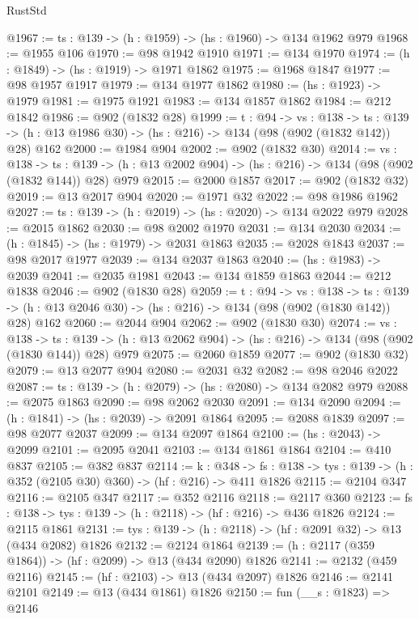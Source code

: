 \begin{lexlean}{RustStd}
\begin{coremodule}
@1967 := {ts : @139} -> (h : @1959) -> (hs : @1960) -> @134 @1962 @979
@1968 := @1955 @106
@1970 := @98 @1942 @1910
@1971 := @134 @1970
@1974 := (h : @1849) -> (hs : @1919) -> @1971 @1862
@1975 := @1968 @1847
@1977 := @98 @1957 @1917
@1979 := @134 @1977 @1862
@1980 := (hs : @1923) -> @1979
@1981 := @1975 @1921
@1983 := @134 @1857 @1862
@1984 := @212 @1842
@1986 := @902 (@1832 @28)
@1999 := {t : @94} ->
  {vs : @138} ->
  {ts : @139} -> (h : @13 @1986 @30) -> (hs : @216) -> @134 (@98 (@902 (@1832 @142)) @28) @162
@2000 := @1984 @904
@2002 := @902 (@1832 @30)
@2014 := {vs : @138} ->
  {ts : @139} -> (h : @13 @2002 @904) -> (hs : @216) -> @134 (@98 (@902 (@1832 @144)) @28) @979
@2015 := @2000 @1857
@2017 := @902 (@1832 @32)
@2019 := @13 @2017 @904
@2020 := @1971 @32
@2022 := @98 @1986 @1962
@2027 := {ts : @139} -> (h : @2019) -> (hs : @2020) -> @134 @2022 @979
@2028 := @2015 @1862
@2030 := @98 @2002 @1970
@2031 := @134 @2030
@2034 := (h : @1845) -> (hs : @1979) -> @2031 @1863
@2035 := @2028 @1843
@2037 := @98 @2017 @1977
@2039 := @134 @2037 @1863
@2040 := (hs : @1983) -> @2039
@2041 := @2035 @1981
@2043 := @134 @1859 @1863
@2044 := @212 @1838
@2046 := @902 (@1830 @28)
@2059 := {t : @94} ->
  {vs : @138} ->
  {ts : @139} -> (h : @13 @2046 @30) -> (hs : @216) -> @134 (@98 (@902 (@1830 @142)) @28) @162
@2060 := @2044 @904
@2062 := @902 (@1830 @30)
@2074 := {vs : @138} ->
  {ts : @139} -> (h : @13 @2062 @904) -> (hs : @216) -> @134 (@98 (@902 (@1830 @144)) @28) @979
@2075 := @2060 @1859
@2077 := @902 (@1830 @32)
@2079 := @13 @2077 @904
@2080 := @2031 @32
@2082 := @98 @2046 @2022
@2087 := {ts : @139} -> (h : @2079) -> (hs : @2080) -> @134 @2082 @979
@2088 := @2075 @1863
@2090 := @98 @2062 @2030
@2091 := @134 @2090
@2094 := (h : @1841) -> (hs : @2039) -> @2091 @1864
@2095 := @2088 @1839
@2097 := @98 @2077 @2037
@2099 := @134 @2097 @1864
@2100 := (hs : @2043) -> @2099
@2101 := @2095 @2041
@2103 := @134 @1861 @1864
@2104 := @410 @837
@2105 := @382 @837
@2114 := {k : @348} ->
  {fs : @138} -> {tys : @139} -> (h : @352 (@2105 @30) @360) -> (hf : @216) -> @411 @1826
@2115 := @2104 @347
@2116 := @2105 @347
@2117 := @352 @2116
@2118 := @2117 @360
@2123 := {fs : @138} -> {tys : @139} -> (h : @2118) -> (hf : @216) -> @436 @1826
@2124 := @2115 @1861
@2131 := {tys : @139} -> (h : @2118) -> (hf : @2091 @32) -> @13 (@434 @2082) @1826
@2132 := @2124 @1864
@2139 := (h : @2117 (@359 @1864)) -> (hf : @2099) -> @13 (@434 @2090) @1826
@2141 := @2132 (@459 @2116)
@2145 := (hf : @2103) -> @13 (@434 @2097) @1826
@2146 := @2141 @2101
@2149 := @13 (@434 @1861) @1826
@2150 := fun (__s : @1823) => @2146

\end{coremodule}
\end{lexlean}
